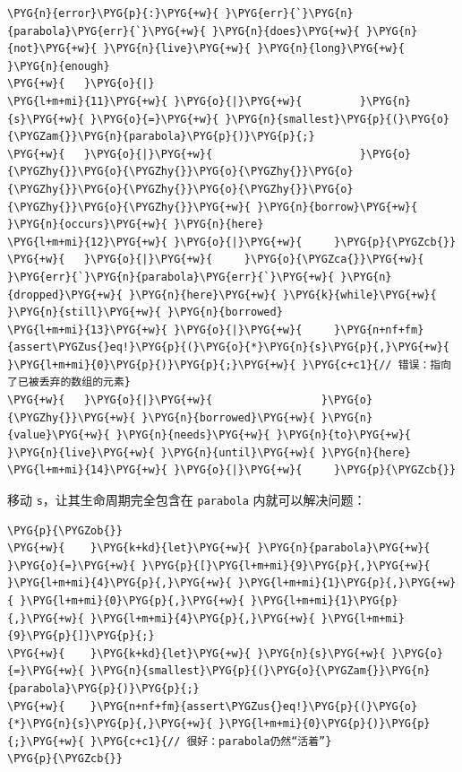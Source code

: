 \begin{Verbatim}[commandchars=\\\{\},breaklines=true,breakanywhere=true,fontsize=\codefont,xleftmargin=17bp]
\PYG{n}{error}\PYG{p}{:}\PYG{+w}{ }\PYG{err}{`}\PYG{n}{parabola}\PYG{err}{`}\PYG{+w}{ }\PYG{n}{does}\PYG{+w}{ }\PYG{n}{not}\PYG{+w}{ }\PYG{n}{live}\PYG{+w}{ }\PYG{n}{long}\PYG{+w}{ }\PYG{n}{enough}
\PYG{+w}{   }\PYG{o}{|}
\PYG{l+m+mi}{11}\PYG{+w}{ }\PYG{o}{|}\PYG{+w}{         }\PYG{n}{s}\PYG{+w}{ }\PYG{o}{=}\PYG{+w}{ }\PYG{n}{smallest}\PYG{p}{(}\PYG{o}{\PYGZam{}}\PYG{n}{parabola}\PYG{p}{)}\PYG{p}{;}
\PYG{+w}{   }\PYG{o}{|}\PYG{+w}{                       }\PYG{o}{\PYGZhy{}}\PYG{o}{\PYGZhy{}}\PYG{o}{\PYGZhy{}}\PYG{o}{\PYGZhy{}}\PYG{o}{\PYGZhy{}}\PYG{o}{\PYGZhy{}}\PYG{o}{\PYGZhy{}}\PYG{o}{\PYGZhy{}}\PYG{+w}{ }\PYG{n}{borrow}\PYG{+w}{ }\PYG{n}{occurs}\PYG{+w}{ }\PYG{n}{here}
\PYG{l+m+mi}{12}\PYG{+w}{ }\PYG{o}{|}\PYG{+w}{     }\PYG{p}{\PYGZcb{}}
\PYG{+w}{   }\PYG{o}{|}\PYG{+w}{     }\PYG{o}{\PYGZca{}}\PYG{+w}{ }\PYG{err}{`}\PYG{n}{parabola}\PYG{err}{`}\PYG{+w}{ }\PYG{n}{dropped}\PYG{+w}{ }\PYG{n}{here}\PYG{+w}{ }\PYG{k}{while}\PYG{+w}{ }\PYG{n}{still}\PYG{+w}{ }\PYG{n}{borrowed}
\PYG{l+m+mi}{13}\PYG{+w}{ }\PYG{o}{|}\PYG{+w}{     }\PYG{n+nf+fm}{assert\PYGZus{}eq!}\PYG{p}{(}\PYG{o}{*}\PYG{n}{s}\PYG{p}{,}\PYG{+w}{ }\PYG{l+m+mi}{0}\PYG{p}{)}\PYG{p}{;}\PYG{+w}{ }\PYG{c+c1}{// 错误：指向了已被丢弃的数组的元素}
\PYG{+w}{   }\PYG{o}{|}\PYG{+w}{                 }\PYG{o}{\PYGZhy{}}\PYG{+w}{ }\PYG{n}{borrowed}\PYG{+w}{ }\PYG{n}{value}\PYG{+w}{ }\PYG{n}{needs}\PYG{+w}{ }\PYG{n}{to}\PYG{+w}{ }\PYG{n}{live}\PYG{+w}{ }\PYG{n}{until}\PYG{+w}{ }\PYG{n}{here}
\PYG{l+m+mi}{14}\PYG{+w}{ }\PYG{o}{|}\PYG{+w}{     }\PYG{p}{\PYGZcb{}}
\end{Verbatim}

移动 \texttt{s}，让其生命周期完全包含在 \texttt{parabola} 内就可以解决问题：

\begin{Verbatim}[commandchars=\\\{\},breaklines=true,breakanywhere=true,fontsize=\codefont,xleftmargin=17bp]
\PYG{p}{\PYGZob{}}
\PYG{+w}{    }\PYG{k+kd}{let}\PYG{+w}{ }\PYG{n}{parabola}\PYG{+w}{ }\PYG{o}{=}\PYG{+w}{ }\PYG{p}{[}\PYG{l+m+mi}{9}\PYG{p}{,}\PYG{+w}{ }\PYG{l+m+mi}{4}\PYG{p}{,}\PYG{+w}{ }\PYG{l+m+mi}{1}\PYG{p}{,}\PYG{+w}{ }\PYG{l+m+mi}{0}\PYG{p}{,}\PYG{+w}{ }\PYG{l+m+mi}{1}\PYG{p}{,}\PYG{+w}{ }\PYG{l+m+mi}{4}\PYG{p}{,}\PYG{+w}{ }\PYG{l+m+mi}{9}\PYG{p}{]}\PYG{p}{;}
\PYG{+w}{    }\PYG{k+kd}{let}\PYG{+w}{ }\PYG{n}{s}\PYG{+w}{ }\PYG{o}{=}\PYG{+w}{ }\PYG{n}{smallest}\PYG{p}{(}\PYG{o}{\PYGZam{}}\PYG{n}{parabola}\PYG{p}{)}\PYG{p}{;}
\PYG{+w}{    }\PYG{n+nf+fm}{assert\PYGZus{}eq!}\PYG{p}{(}\PYG{o}{*}\PYG{n}{s}\PYG{p}{,}\PYG{+w}{ }\PYG{l+m+mi}{0}\PYG{p}{)}\PYG{p}{;}\PYG{+w}{ }\PYG{c+c1}{// 很好：parabola仍然“活着”}
\PYG{p}{\PYGZcb{}}
\end{Verbatim}

